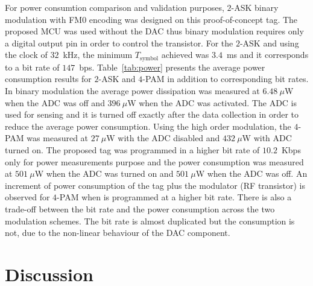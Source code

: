 \documentclass[journal]{IEEEtran}
\begin{document}
For power consumtion comparison and validation purposes,  $2$-ASK binary modulation  with FM0 encoding \cite{daskalakis2017ambient} was designed on this proof-of-concept tag. 
%
The proposed MCU was used without the DAC thus binary modulation requires only a digital output pin in order to control the transistor.
%
For the $2$-ASK and using the clock of $32$~kHz, the minimum $T_\text{symbol}$ achieved was $3.4$~ms and it corresponds to  a bit rate of $147$~bps.
% 
Table~\ref{tab:power} presents the  average power consumption results for $2$-ASK and $4$-PAM in addition to corresponding bit rates.
%
In binary modulation the average power dissipation was measured  at $6.48~\mu$W when the ADC was off and $396~\mu$W when the ADC was activated. 
%
The ADC is used for sensing and it  is turned off exactly after  the data collection in order to reduce the average power consumption.
%
Using the high order modulation, the $4$-PAM was measured at $27~\mu$W with the ADC disabled and $432~\mu$W with ADC turned on.
%
The proposed tag was programmed in a higher bit rate of $10.2$~Kbps only for power measurements purpose  and the power consumption was measured at $501~\mu$W when the ADC was turned on and $501~\mu$W when the ADC was off. 
%
An increment of  power consumption of the tag plus the modulator (RF transistor) is observed  for $4$-PAM when is programmed  at a higher bit rate.
%
%
%
There is also a trade-off between the
bit rate and the power  consumption across  the two
modulation schemes.
% 
The bit rate is almost duplicated  but the consumption is not, due to the non-linear behaviour of the DAC component.


\section{Discussion}
\label{Sec:Discussion}
\end{document}
